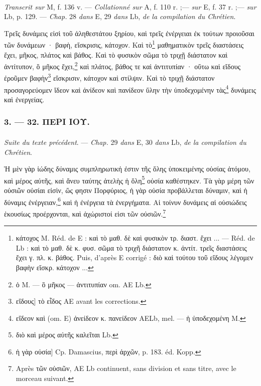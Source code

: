 \documentclass[landscape, a4paper, 11pt, oneside, polutonikogreek, french]{article}
\begin{document}
\paragraph{}
\emph{Transcrit sur} M, f. 136 v. --- \emph{Collationné sur} A, f. 110 r. ;--- \emph{sur} E, f. 37 r. ;--- \emph{sur} Lb, p. 129. --- \emph{Chap.} 28 \emph{dans} E, 29 \emph{dans} Lb, \emph{de la compilation du Chrétien}.

\bigskip

Τρεῖς δυνάμεις εἰσὶ τοῦ ἀληθεστάτου ξηρίου, καὶ τρεῖς ἐνέργειαι ἐκ τούτων προιοῦσαι τῶν δυνάμεων · βαφὴ, εἴσκρισις, κάτοχον. Καὶ τὸ\footnote{κάτοχος M. Réd. de E : καὶ τὸ μαθ. δὲ καὶ φυσικὸν τρ. διαστ. ἔχει ... --- Réd. de Lb : καὶ τὸ μαθ. δὲ κ. φυσ. σῶμα τὸ τριχῆ διάστατον κ. ἀντίτ. τρεῖς διαστάσεις ἔχει γ. πλ. κ. βάθος. Puis, d'après E corrigé : διὸ καὶ τούτου τοῦ εἴδους λέγομεν βαφὴν εἴσκρ. κάτοχον ...} μαθηματικὸν τρεῖς διαστάσεις ἔχει, μῆκος, πλάτος καὶ βάθος. Καὶ τὸ φυσικὸν σῶμα τὸ τριχῇ διάστατον καὶ ἀντίτυπον, ὃ μῆκος ἔχει,\footnote{ὁ M. --- ὃ μῆκος --- ἀντιτυπίαν om. AE Lb.} καὶ πλάτος, βάθος τε καὶ ἀντιτυπίαν · οὕτω καὶ εἴδους ἐροῦμεν βαφὴν\footnote{εἴδους] τὸ εἶδος AE avant les corrections.} εἴσκρισιν, κάτοχον καὶ στίλψιν. Καὶ τὸ τριχῇ διάστατον προσαγορεύομεν ἴδεον καὶ ἀνίδεον καὶ πανίδεον ὕλην τὴν ὑποδεχομένην τὰς\footnote{εἴδεον καὶ (om. E) ἀνείδεον κ. πανείδεον AELb, mel. --- ἡ ὑποδεχομένη M.} δυνάμεις καὶ ἐνεργείας.

\bigskip
\centerline{\EightStarTaper}
\centerline{\EightStarTaper\EightStarTaper}
\bigskip

\subsubsection{3. --- 32. ΠΕΡΙ ΙΟΥ.}
\paragraph{}
\emph{Suite du texte précédent}. --- \emph{Chap.} 29 \emph{dans} E, 30 \emph{dans} Lb, \emph{de la compilation du Chrétien}.

\bigskip

Ἡ μὲν γὰρ ἰώδης δύναμις συμπληρωτική ἐστιν τῆς ὅλης ὑποκειμένης οὐσίας ἀτόμου, καὶ μέρος αὐτῆς, καὶ ἄνευ ταύτης ἀτελὴς ἡ ὅλη\footnote{διὸ καὶ μέρος αὐτῆς καλεῖται Lb.} οὐσία καθέστηκεν. Τὰ γὰρ μέρη τῶν οὐσιῶν οὐσίαι εἰσὶν, ὥς φησιν Πορφύριος, ἡ γὰρ οὐσία προβάλλεται δύναμιν, καὶ ἡ δύναμις ἐνέργειαν,\footnote{ἡ γὰρ οὐσία] Cp. Damascius, περὶ ἀρχῶν, p. 183. éd. Kopp.} καὶ ἡ ἐνέργεια τὰ ἐνεργήματα. Αἱ τοίνυν δυνάμεις αἱ οὐσιώδεις ἑκουσίως προέρχονται, καὶ ἀχώριστοί εἰσι τῶν οὐσιῶν.\footnote{Après τῶν οὐσιῶν, AE Lb continuent, sans division et sans titre, avec le morceau suivant.}
\end{document}
